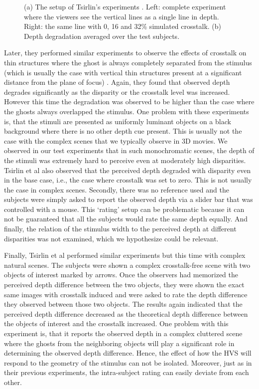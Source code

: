 \begin{figure}[htbp]
\begin{subfigure}[b]{0.5\textwidth}
        \caption{}\label{fig:tsirlin_res}
    \end{subfigure}
    \caption{(a) The setup of Tsirlin's experiments \cite{tsirlin2012effect}\cite{tsirlin2012crosstalk}. Left: complete experiment where the viewers see the vertical lines as a single line in depth. Right: the same line with 0, 16 and 32\% simulated crosstalk. (b) Depth degradation averaged over the test subjects.\label{fig:tsirlin}}
\end{figure}

 Later, they performed similar experiments to observe the effects of crosstalk on thin structures where the ghost is always completely separated from the stimulus (which is usually the case with vertical thin structures present at a significant distance from the plane of focus) \cite{tsirlin2012effect}. Again, they found that observed depth degrades significantly as the disparity or the crosstalk level was increased. However this time the degradation was observed to be higher than the case where the ghosts always overlapped the stimulus. One problem with these experiments is, that the stimuli are presented as uniformly luminant objects on a black background where there is no other depth cue present. This is usually not the case with the complex scenes that we typically observe in 3D movies. We observed in our test experiments that in such monochromatic scenes, the depth of the stimuli was extremely hard to perceive even at moderately high disparities. Tsirlin et al also observed that the perceived depth degraded with disparity even in the base case, i.e., the case where crosstalk was set to zero. This is not usually the case in complex scenes. Secondly, there was no reference used and the subjects were simply asked to report the observed depth via a slider bar that was controlled with a mouse. This `rating' setup can be problematic because it can not be guaranteed that all the subjects would rate the same depth equally. And finally, the relation of the stimulus width to the perceived depth at different disparities was not examined, which we hypothesize could be relevant.

Finally, Tsirlin et al\cite{tsirlin2012crosstalk} performed similar experiments but this time with complex natural scenes. The subjects were shown a complex crosstalk-free scene with two objects of interest marked by arrows. Once the observers had memorized the perceived depth difference between the two objects, they were shown the exact same images with crosstalk induced and were asked to rate the depth difference they observed between those two objects. The results again indicated that the perceived depth difference decreased as the theoretical depth difference between the objects of interest and the crosstalk increased. One problem with this experiment is, that it reports the observed depth in a complex cluttered scene where the ghosts from the neighboring objects will play a significant role in determining the observed depth difference. Hence, the effect of how the HVS will respond to the geometry of the stimulus can not be isolated. Moreover, just as in their previous experiments, the intra-subject rating can easily deviate from each other.

